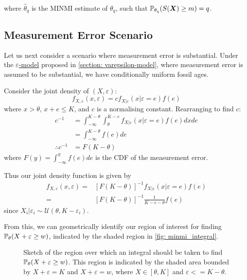where $\hat\theta_q$ is the MINMI estimate of $\theta_q$, such that $\mathbb{P}_{\theta_q} (S(\bm{X}) \geq m) = q$.

\subsection{Measurement Error Scenario}

Let us next consider a scenario where measurement error is substantial. Under the \hyperref[model: measurement-error]{$\varepsilon$-model} proposed in \autoref{section: varepsilon-model}, where measurement error is assumed to be substantial, we have conditionally uniform fossil ages.

Consider the joint density of $(X, \varepsilon)$:
\[
    f_{X, \varepsilon} ( x , \varepsilon) = c f_{X | \varepsilon} ( x | \varepsilon=e) f(e)
\] where $x > \theta$, $x+e \leq K$, and $c$ is a normalising constant. Rearranging to find $c$:
\begin{align*}
    c^{-1}
        &= \int_{-\infty}^{K-\theta} \int_{\theta}^{K-e} f_{X | \varepsilon} ( x | \varepsilon=e) f(e) dx de\\
        &= \int_{-\infty}^{K-\theta} f(e) de \\
    \therefore c^{-1} &= F(K - \theta)
\end{align*}
where $F(y)=\int_{-\infty}^{y} f(e) de$ is the CDF of the measurement error.

Thus our joint density function is given by
\begin{align*}
    f_{X, \varepsilon} ( x , \varepsilon)
        =& [F(K - \theta)]^{-1} f_{X | \varepsilon} ( x | \varepsilon=e) f(e) \\
        =& [F(K - \theta)]^{-1} \frac{1}{K - e - \theta} f(e)
\end{align*}
since $X_i | \varepsilon_i \sim \mathcal{U}(\theta, K-\varepsilon_i)$. 

From this, we can geometrically identify our region of interest for finding $\mathbb{P}_\theta ( X + \varepsilon \geq w)$, indicated by the shaded region in \autoref{fig: minmi_integral}.
\begin{figure}[ht]
    \centering
    
    \caption{Sketch of the region over which an integral should be taken to find $\mathbb{P}_\theta ( X + \varepsilon \geq w)$. This region is indicated by the shaded area bounded by  $X+\varepsilon = K$ and $X + \varepsilon = w$, where $X \in [\theta, K]$ and $\varepsilon <= K-\theta$.}
    \label{fig: minmi_integral}
\end{figure}

